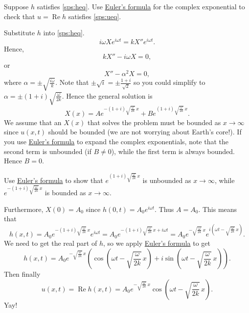 \begin{exercise}
Suppose $h$ satisfies \eqref{sps:heq}.
Use \hyperref[eulersformula]{Euler's formula} for the complex exponential to
check that $u = \operatorname{Re} h$ satisfies \eqref{sps:ueq}.
\end{exercise}

Substitute $h$ into \eqref{sps:heq}.
\begin{equation*}
i\omega X e^{i\omega t} = k X'' e^{i \omega t} .
\end{equation*}
Hence,
\begin{equation*}
k X''  - i \omega X = 0 ,
\end{equation*}
or 
\begin{equation*}
X''  - \alpha^2 X = 0 ,
\end{equation*}
where $\alpha = \pm \sqrt{\frac{i\omega}{k}}$.  Note that $\pm \sqrt{i} = \pm
\frac{1+i}{\sqrt{2}}$ so you could simplify to
$\alpha = \pm (1+i)\sqrt{\frac{\omega}{2k}}$.
Hence the general solution is
\begin{equation*}
X(x) = A e^{-(1+i)\sqrt{\frac{\omega}{2k}} \, x}
+ B e^{(1+i)\sqrt{\frac{\omega}{2k}} \, x} .
\end{equation*}
We assume that an $X(x)$ that solves the problem must be bounded as $x \to
\infty$ since $u(x,t)$ should be bounded
(we are not worrying about Earth's core!).
If you use \hyperref[eulersformula]{Euler's formula} to expand the complex exponentials, 
note that the second term is unbounded (if $B \not = 0$),
while the first term is always bounded.  Hence $B=0$.

\begin{exercise}
Use \hyperref[eulersformula]{Euler's formula} to show that
$e^{(1+i)\sqrt{\frac{\omega}{2k}} \, x}$ is unbounded as $x \to \infty$,
while $e^{-(1+i)\sqrt{\frac{\omega}{2k}} \, x}$ is bounded
as $x \to \infty$.
\end{exercise}

Furthermore, $X(0) = A_0$ since $h(0,t) = A_0 e^{i \omega t}$.
Thus $A=A_0$.  This means that
\begin{equation*}
h(x,t) = A_0 e^{-(1+i)\sqrt{\frac{\omega}{2k}} \, x} e^{i \omega t}
=
A_0 e^{-(1+i)\sqrt{\frac{\omega}{2k}} \, x + i \omega t}
=
A_0 e^{-\sqrt{\frac{\omega}{2k}} \, x}
e^{i(\omega t - \sqrt{\frac{\omega}{2k}} \, x)} .
\end{equation*}
We need to get the real part of $h$, so
we apply \hyperref[eulersformula]{Euler's formula} to get
\begin{equation*}
h(x,t) =
A_0 e^{-\sqrt{\frac{\omega}{2k}} \, x}
\left(\cos \left(\omega t - \sqrt{\frac{\omega}{2k}}\, x\right) + 
i \sin \left(\omega t - \sqrt{\frac{\omega}{2k}}\, x\right) \right) .
\end{equation*}
Then finally
\begin{equation*}
u(x,t) = \operatorname{Re} h(x,t) =
A_0 e^{-\sqrt{\frac{\omega}{2k}}\, x}
\cos \left(\omega t - \sqrt{\frac{\omega}{2k}}\, x\right) .
\end{equation*}
Yay!


